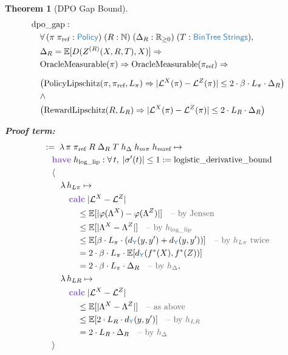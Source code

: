 \documentclass[11pt]{article}
\theoremstyle{definition}
\theoremstyle{plain}
\newtheorem{thmenv}{Theorem}
\newcommand{\kw}[1]{\textcolor{keyword}{\textbf{#1}}}
\newcommand{\ty}[1]{\textcolor{type}{\mathsf{#1}}}
\newcommand{\fn}[1]{\mathrm{#1}}
\newcommand{\cmt}[1]{\textcolor{comment}{\text{-- #1}}}
\newcommand{\lam}{\lambda\,}
\newcommand{\all}{\forall\,}
\newcommand{\Arr}{\Rightarrow}
\newcommand{\pf}{:=\;}
\newcommand{\Strings}{\ty{Strings}}
\newcommand{\Y}{\ty{Y}}
\newcommand{\Rnn}{\mathbb{R}_{\geq 0}}
\newcommand{\N}{\mathbb{N}}
\newcommand{\fstar}{f^*}
\newcommand{\dY}{d_{\Y}}
\newcommand{\E}{\mathbb{E}}
\newcommand{\ZR}{Z^{(R)}}
\begin{document}
\begin{thmenv}[DPO Gap Bound]
\label{thm:dpo_gap}
\begin{align*}
&\fn{dpo\_gap} : \\
&\quad \all (\pi\; \pi_{\text{ref}} : \ty{Policy})\; (R : \N)\; (\Delta_R : \Rnn)\; (T : \ty{BinTree}\;\Strings), \\
&\quad \Delta_R = \E[D(\ZR(X, R, T), X)] \Arr \\
&\quad \fn{OracleMeasurable}(\pi) \Arr \fn{OracleMeasurable}(\pi_{\text{ref}}) \Arr \\[6pt]
&\quad \big(\fn{PolicyLipschitz}(\pi, \pi_{\text{ref}}, L_\pi) \Arr |\mathcal{L}^X(\pi) - \mathcal{L}^Z(\pi)| \leq 2 \cdot \beta \cdot L_\pi \cdot \Delta_R\big) \\
&\quad \land \\
&\quad \big(\fn{RewardLipschitz}(R, L_R) \Arr |\mathcal{L}^X(\pi) - \mathcal{L}^Z(\pi)| \leq 2 \cdot L_R \cdot \Delta_R\big)
\end{align*}

\textbf{Proof term:}
\begin{align*}
&\pf \lam \pi\; \pi_{\text{ref}}\; R\; \Delta_R\; T\; h_\Delta\; h_{m\pi}\; h_{m\text{ref}} \mapsto \\
&\quad \kw{have}\; h_{\text{log\_lip}} : \all t,\; |\sigma'(t)| \leq 1 := \fn{logistic\_derivative\_bound} \\
&\quad \langle \\
&\quad\quad \lam h_{L\pi} \mapsto \\
&\quad\quad\quad \kw{calc}\; |\mathcal{L}^X - \mathcal{L}^Z| \\
&\quad\quad\quad\quad \leq \E[|\varphi(\Lambda^X) - \varphi(\Lambda^Z)|] \quad\cmt{by Jensen} \\
&\quad\quad\quad\quad \leq \E[|\Lambda^X - \Lambda^Z|] \quad\cmt{by $h_{\text{log\_lip}}$} \\
&\quad\quad\quad\quad \leq \E[\beta \cdot L_\pi \cdot (\dY(y, y') + \dY(y, y'))] \quad\cmt{by $h_{L\pi}$ twice} \\
&\quad\quad\quad\quad = 2 \cdot \beta \cdot L_\pi \cdot \E[\dY(\fstar(X), \fstar(Z))] \\
&\quad\quad\quad\quad = 2 \cdot \beta \cdot L_\pi \cdot \Delta_R \quad\cmt{by $h_\Delta$}, \\
&\quad\quad \lam h_{LR} \mapsto \\
&\quad\quad\quad \kw{calc}\; |\mathcal{L}^X - \mathcal{L}^Z| \\
&\quad\quad\quad\quad \leq \E[|\Lambda^X - \Lambda^Z|] \quad\cmt{as above} \\
&\quad\quad\quad\quad \leq \E[2 \cdot L_R \cdot \dY(y, y')] \quad\cmt{by $h_{LR}$} \\
&\quad\quad\quad\quad = 2 \cdot L_R \cdot \Delta_R \quad\cmt{by $h_\Delta$} \\
&\quad \rangle
\end{align*}
\end{thmenv}
\end{document}

